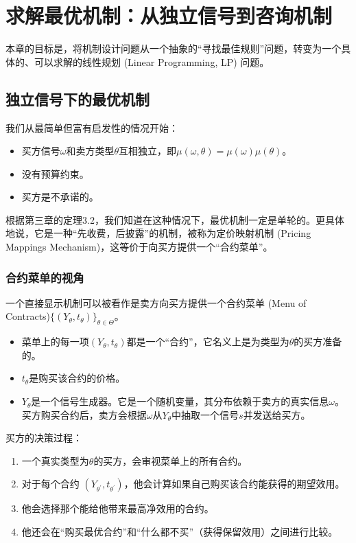 \section{求解最优机制：从独立信号到咨询机制}

本章的目标是，将机制设计问题从一个抽象的“寻找最佳规则”问题，转变为一个具体的、可以求解的线性规划 (Linear Programming, LP) 问题。

\subsection{独立信号下的最优机制}

我们从最简单但富有启发性的情况开始：

\begin{itemize}
    \item 买方信号$\omega$和卖方类型$\theta$互相独立，即$\mu(\omega,\theta)=\mu(\omega)\mu(\theta)$。
    \item 没有预算约束。
    \item 买方是不承诺的。
\end{itemize}

根据第三章的定理3.2，我们知道在这种情况下，最优机制一定是单轮的。更具体地说，它是一种“先收费，后披露”的机制，被称为定价映射机制 (Pricing Mappings Mechanism)，这等价于向买方提供一个“合约菜单”。

\subsubsection{合约菜单的视角}

一个直接显示机制可以被看作是卖方向买方提供一个合约菜单 (Menu of Contracts)$\{(Y_\theta, t_\theta)\}_{\theta\in\Theta}$。

\begin{itemize}
    \item 菜单上的每一项$(Y_\theta,t_\theta)$都是一个“合约”，它名义上是为类型为$\theta$的买方准备的。
    \item $t_\theta$是购买该合约的价格。
    \item $Y_\theta$是一个信号生成器。它是一个随机变量，其分布依赖于卖方的真实信息$\omega$。买方购买合约后，卖方会根据$\omega$从$Y_\theta$中抽取一个信号$s$并发送给买方。
\end{itemize}

买方的决策过程：

\begin{enumerate}
    \item 一个真实类型为$\theta$的买方，会审视菜单上的所有合约。
    \item 对于每个合约 $(Y_{\theta^\prime},t_{\theta^\prime})$，他会计算如果自己购买该合约能获得的期望效用。
    \item 他会选择那个能给他带来最高净效用的合约。
    \item 他还会在“购买最优合约”和“什么都不买”（获得保留效用）之间进行比较。
\end{enumerate}

